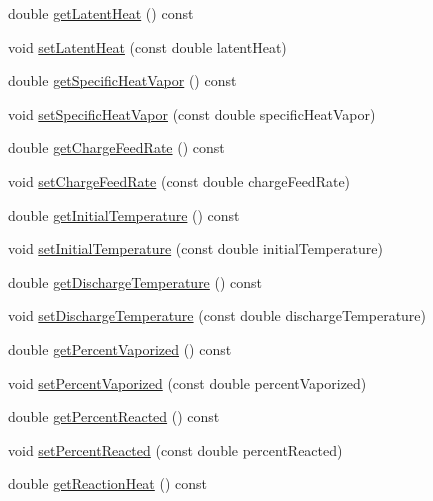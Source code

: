 \begin{DoxyCompactItemize}
\item 
double \hyperlink{class_liquid_load_charge_material_aca3a38eb3343144042e9349b053da1bc}{get\+Latent\+Heat} () const
\item 
void \hyperlink{class_liquid_load_charge_material_a01d2d23580f27aa9e5cba1124635a677}{set\+Latent\+Heat} (const double latent\+Heat)
\item 
double \hyperlink{class_liquid_load_charge_material_ac4538f9722bf25465ec86586469a7b1e}{get\+Specific\+Heat\+Vapor} () const
\item 
void \hyperlink{class_liquid_load_charge_material_ae95faf01cf6293ab282b1b7fe3b849e1}{set\+Specific\+Heat\+Vapor} (const double specific\+Heat\+Vapor)
\item 
double \hyperlink{class_liquid_load_charge_material_af818c541527b3b28a8f84a08dc0c884e}{get\+Charge\+Feed\+Rate} () const
\item 
void \hyperlink{class_liquid_load_charge_material_a23d6aa6f15a124ddb1504261347b0b82}{set\+Charge\+Feed\+Rate} (const double charge\+Feed\+Rate)
\item 
double \hyperlink{class_liquid_load_charge_material_ab80229a78f884fb07e756665a616d401}{get\+Initial\+Temperature} () const
\item 
void \hyperlink{class_liquid_load_charge_material_ac30600ef82db69934e8c08e4a774bb03}{set\+Initial\+Temperature} (const double initial\+Temperature)
\item 
double \hyperlink{class_liquid_load_charge_material_ad474f33059c99aa94e1d63738e11ff0e}{get\+Discharge\+Temperature} () const
\item 
void \hyperlink{class_liquid_load_charge_material_a04ef0778e524f531b6dd2dd6137c270d}{set\+Discharge\+Temperature} (const double discharge\+Temperature)
\item 
double \hyperlink{class_liquid_load_charge_material_a8e55b0df0a0551671636bcf169228dca}{get\+Percent\+Vaporized} () const
\item 
void \hyperlink{class_liquid_load_charge_material_aaf2aa3303201370a7b79e5b3f54e135a}{set\+Percent\+Vaporized} (const double percent\+Vaporized)
\item 
double \hyperlink{class_liquid_load_charge_material_acfedb26800cbead9bf11c57e1356dd57}{get\+Percent\+Reacted} () const
\item 
void \hyperlink{class_liquid_load_charge_material_a9984b8c78a460ef3569fc3ef13eea604}{set\+Percent\+Reacted} (const double percent\+Reacted)
\item 
double \hyperlink{class_liquid_load_charge_material_a2f0c26e789e98efd1e8fd0c8741ddd92}{get\+Reaction\+Heat} () const

\end{DoxyCompactItemize}
